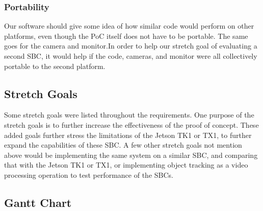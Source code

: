 \subsubsection{Portability}
Our software should give some idea of how similar code would perform on other platforms, even though the PoC itself does not have to be portable. The same goes for the camera and monitor.In order to help our stretch goal of evaluating a second SBC, it would help if the code, cameras, and monitor were all collectively portable to the second platform.\\

\subsection{Stretch Goals}
Some stretch goals were listed throughout the requirements. One purpose of the stretch goals is to further increase the effectiveness of the proof of concept. These added goals further stress the limitations of the Jetson TK1 or TX1, to further expand the capabilities of these SBC. A few other stretch goals not mention above would be implementing the same system on a similar SBC, and comparing that with the Jetson TK1 or TX1, or implementing object tracking as a video processing operation to test performance of the SBCs.\\

\subsection{Gantt Chart}

